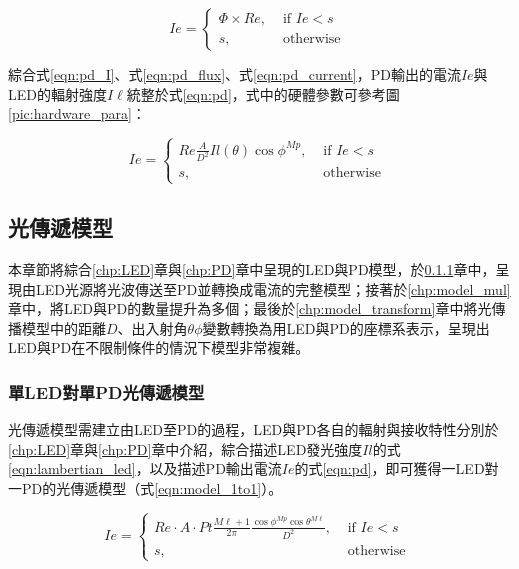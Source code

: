         \begin{equation}
            \label{eqn:pd_current}
            Ie = \begin{cases}\Phi\times Re, & \text { if } Ie<s \\ s, & \text { otherwise }\end{cases}
        \end{equation}

        綜合式\ref{eqn:pd_I}、式\ref{eqn:pd_flux}、式\ref{eqn:pd_current}，PD輸出的電流$Ie$與LED的輻射強度$I\ell$統整於式\ref{eqn:pd}，式中的硬體參數可參考圖\ref{pic:hardware_para}：

        \begin{equation}
            \label{eqn:pd}
            Ie = \begin{cases}Re \frac{A}{D^2}Il(\theta) \cos \phi^{Mp}, & \text { if } Ie<s \\ s, & \text { otherwise }\end{cases}
        \end{equation}

        
        


        

    \subsection{光傳遞模型}
    \label{chp:model}

    本章節將綜合\ref{chp:LED}章與\ref{chp:PD}章中呈現的LED與PD模型，於\ref{chp:model_1to1}章中，呈現由LED光源將光波傳送至PD並轉換成電流的完整模型；接著於\ref{chp:model_mul}章中，將LED與PD的數量提升為多個；最後於\ref{chp:model_transform}章中將光傳播模型中的距離$D$、出入射角$\theta\phi$變數轉換為用LED與PD的座標系表示，呈現出LED與PD在不限制條件的情況下模型非常複雜。
    
    \subsubsection{單LED對單PD光傳遞模型}
    \label{chp:model_1to1}

    光傳遞模型需建立由LED至PD的過程，LED與PD各自的輻射與接收特性分別於\ref{chp:LED}章與\ref{chp:PD}章中介紹，綜合描述LED發光強度$Il$的式\ref{eqn:lambertian_led}，以及描述PD輸出電流$Ie$的式\ref{eqn:pd}，即可獲得一LED對一PD的光傳遞模型（式\ref{eqn:model_1to1}）。

    \begin{equation}
        \label{eqn:model_1to1}
        Ie = \begin{cases}Re \cdot A\cdot Pt\frac{M\ell+1}{2\pi}\frac{\cos \phi^{Mp}\cos \theta^{M\ell}}{D^2}, & \text { if } Ie<s \\ s, & \text { otherwise }\end{cases}
    \end{equation}

